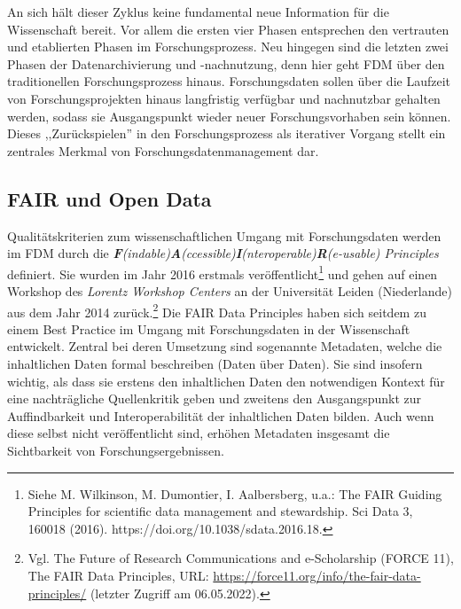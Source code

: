 An sich hält dieser Zyklus keine fundamental neue Information für die Wissenschaft bereit. Vor allem die ersten vier Phasen entsprechen den vertrauten und etablierten Phasen im Forschungsprozess. Neu hingegen sind die letzten zwei Phasen der Datenarchivierung und -nachnutzung, denn hier geht FDM über den traditionellen Forschungsprozess hinaus. Forschungsdaten sollen über die Laufzeit von Forschungsprojekten hinaus langfristig verfügbar und nachnutzbar gehalten werden, sodass sie Ausgangspunkt wieder neuer Forschungsvorhaben sein können. Dieses ,,Zurückspielen'' in den Forschungsprozess als iterativer Vorgang stellt ein zentrales Merkmal von Forschungsdatenmanagement dar.

\subsection{FAIR und Open Data}

Qualitätskriterien zum wissenschaftlichen Umgang mit Forschungsdaten werden im FDM durch die \textit{\textbf{F}(indable)\textbf{A}(ccessible)\textbf{I}(nteroperable)\textbf{R}(e-usable) Principles} definiert. Sie wurden im Jahr 2016 erstmals veröffentlicht\footnote{Siehe M. Wilkinson, M. Dumontier, I. Aalbersberg, u.a.: The FAIR Guiding Principles for scientific data management and stewardship. Sci Data 3, 160018 (2016). https://doi.org/10.1038/sdata.2016.18.} und gehen auf einen Workshop des \textit{Lorentz Workshop Centers} an der Universität Leiden (Niederlande) aus dem Jahr 2014 zurück.\footnote{Vgl. The Future of Research Communications and e-Scholarship (FORCE 11), The FAIR Data Principles, URL: \url{https://force11.org/info/the-fair-data-principles/} (letzter Zugriff am 06.05.2022).} Die FAIR Data Principles haben sich seitdem zu einem Best Practice im Umgang mit Forschungsdaten in der Wissenschaft entwickelt. Zentral bei deren Umsetzung sind sogenannte Metadaten, welche die inhaltlichen Daten formal beschreiben (Daten über Daten). Sie sind insofern wichtig, als dass sie erstens den inhaltlichen Daten den notwendigen Kontext für eine nachträgliche Quellenkritik geben und zweitens den Ausgangspunkt zur Auffindbarkeit und Interoperabilität der inhaltlichen Daten bilden. Auch wenn diese selbst nicht veröffentlicht sind, erhöhen Metadaten insgesamt die Sichtbarkeit von Forschungsergebnissen. 

